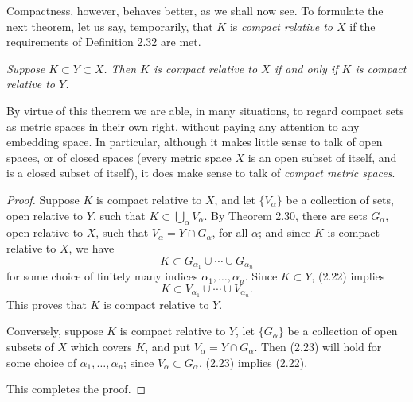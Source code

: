 Compactness, however, behaves better, as we shall now see. To formulate the
next theorem, let us say, temporarily, that $K$ is \emph{compact relative to
$X$} if the requirements of Definition 2.32 are met.

\emph{Suppose $K \subset Y \subset X$. Then $K$ is compact relative to $X$ if
and only if $K$ is compact relative to $Y$.}

By virtue of this theorem we are able, in many situations, to regard compact
sets as metric spaces in their own right, without paying any attention to any
embedding space. In particular, although it makes little sense to talk of open
spaces, or of closed spaces (every metric space $X$ is an open subset of
itself, and is a closed subset of itself), it does make sense to talk of
\emph{compact metric spaces}.

\begin{proof}
Suppose $K$ is compact relative to $X$, and let $\{V_\alpha\}$ be a collection
of sets, open relative to $Y$, such that $K \subset \bigcup_\alpha V_\alpha$.
By Theorem 2.30, there are sets $G_\alpha$, open relative to $X$, such that
$V_\alpha = Y \cap G_\alpha$, for all $\alpha$; and since $K$ is compact
relative to $X$, we have
\begin{equation}
  K \subset G_{\alpha_1} \cup \cdots \cup G_{\alpha_n} \tag{2.22}
\end{equation}
for some choice of finitely many indices $\alpha_1,\dots,\alpha_n$. Since
$K \subset Y$, (2.22) implies
\begin{equation}
  K \subset V_{\alpha_1} \cup \cdots \cup V_{\alpha_n}. \tag{2.23}
\end{equation}
This proves that $K$ is compact relative to $Y$.

Conversely, suppose $K$ is compact relative to $Y$, let $\{G_\alpha\}$ be a
collection of open subsets of $X$ which covers $K$, and put
$V_\alpha = Y \cap G_\alpha$. Then (2.23) will hold for some choice of
$\alpha_1,\dots,\alpha_n$; since $V_\alpha \subset G_\alpha$, (2.23) implies
(2.22).

This completes the proof.
\end{proof}


